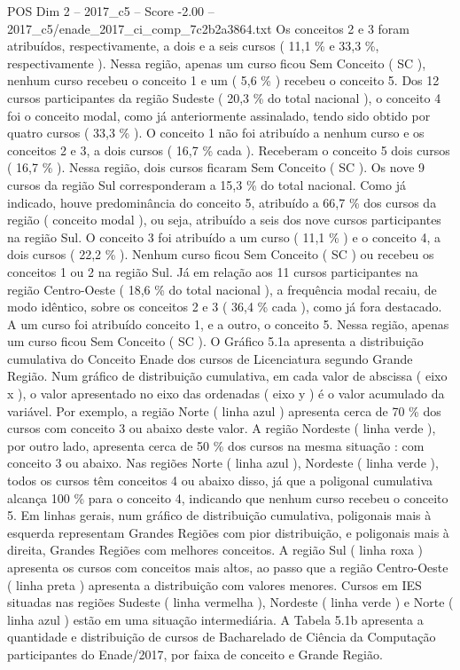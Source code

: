 \begin{textsample}{POS Dim 2 – 2017\_c5 – Score -2.00 – 2017\_c5/enade\_2017\_ci\_comp\_7c2b2a3864.txt}
Os conceitos 2 e 3 foram atribuídos, respectivamente, a dois e a seis cursos ( 11,1 \% e 33,3 \%, respectivamente ).
Nessa região, apenas um curso ficou Sem Conceito ( SC ), nenhum curso recebeu o conceito 1 e um ( 5,6 \% ) recebeu o conceito 5.
Dos 12 cursos participantes da região Sudeste ( 20,3 \% do total nacional ), o conceito 4 foi o conceito modal, como já anteriormente assinalado, tendo sido obtido por quatro cursos ( 33,3 \% ).
O conceito 1 não foi atribuído a nenhum curso e os conceitos 2 e 3, a dois cursos ( 16,7 \% cada ).
Receberam o conceito 5 dois cursos ( 16,7 \% ).
Nessa região, dois cursos ficaram Sem Conceito ( SC ).
Os nove 9 cursos da região Sul corresponderam a 15,3 \% do total nacional.
Como já indicado, houve predominância do conceito 5, atribuído a 66,7 \% dos cursos da região ( conceito modal ), ou seja, atribuído a seis dos nove cursos participantes na região Sul.
O conceito 3 foi atribuído a um curso ( 11,1 \% ) e o conceito 4, a dois cursos ( 22,2 \% ).
Nenhum curso ficou Sem Conceito ( SC ) ou recebeu os conceitos 1 ou 2 na região Sul.
Já em relação aos 11 cursos participantes na região Centro-Oeste ( 18,6 \% do total nacional ), a frequência modal recaiu, de modo idêntico, sobre os conceitos 2 e 3 ( 36,4 \% cada ), como já fora destacado.
A um curso foi atribuído conceito 1, e a outro, o conceito 5.
Nessa região, apenas um curso ficou Sem Conceito ( SC ).
O Gráfico 5.1a apresenta a distribuição cumulativa do Conceito Enade dos cursos de Licenciatura segundo Grande Região.
Num gráfico de distribuição cumulativa, em cada valor de abscissa ( eixo x ), o valor apresentado no eixo das ordenadas ( eixo y ) é o valor acumulado da variável.
Por exemplo, a região Norte ( linha azul ) apresenta cerca de 70 \% dos cursos com conceito 3 ou abaixo deste valor.
A região Nordeste ( linha verde ), por outro lado, apresenta cerca de 50 \% dos cursos na mesma situação : com conceito 3 ou abaixo.
Nas regiões Norte ( linha azul ), Nordeste ( linha verde ), todos os cursos têm conceitos 4 ou abaixo disso, já que a poligonal cumulativa alcança 100 \% para o conceito 4, indicando que nenhum curso recebeu o conceito 5.
Em linhas gerais, num gráfico de distribuição cumulativa, poligonais mais à esquerda representam Grandes Regiões com pior distribuição, e poligonais mais à direita, Grandes Regiões com melhores conceitos.
A região Sul ( linha roxa ) apresenta os cursos com conceitos mais altos, ao passo que a região Centro-Oeste ( linha preta ) apresenta a distribuição com valores menores.
Cursos em IES situadas nas regiões Sudeste ( linha vermelha ), Nordeste ( linha verde ) e Norte ( linha azul ) estão em uma situação intermediária.
A Tabela 5.1b apresenta a quantidade e distribuição de cursos de Bacharelado de Ciência da Computação participantes do Enade/2017, por faixa de conceito e Grande Região.

\end{textsample}
